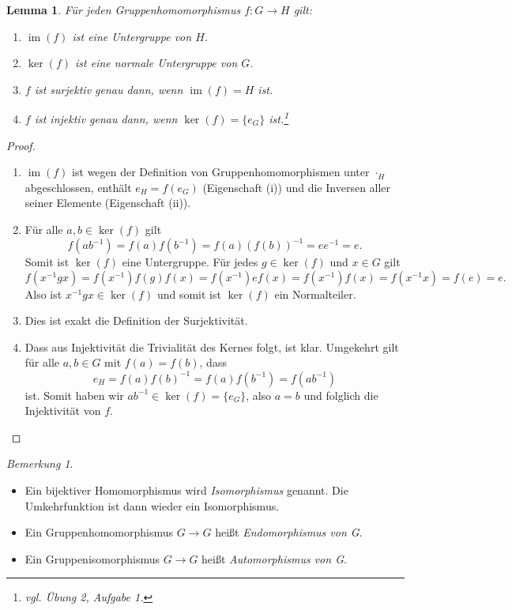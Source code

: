 \documentclass[12pt]{scrartcl} %
\DeclareMathOperator{\im}{im}
\newtheorem{lemma}{Lemma}
\theoremstyle{definition}
\theoremstyle{remark}
\newtheorem*{nb}{Bemerkung}
\begin{document}
\begin{lemma}
	Für jeden Gruppenhomomorphismus $ f: G \rightarrow H$ gilt:
	\begin{enumerate}[label=(\roman*)]
	\item $\im(f)$ ist eine Untergruppe von $H$.
	\item $\ker(f)$ ist eine normale Untergruppe von $G$.
	\item $f$ ist surjektiv genau dann, wenn $\im(f) = H$ ist.
	\item $f$ ist injektiv genau dann, wenn $\ker(f) = \{e_G\}$ ist.\footnote{vgl. Übung 2, Aufgabe 1.}
	\end{enumerate}
\end{lemma}

\begin{proof}
	\begin{enumerate}[label=(\roman*)]
	\item $\im(f)$ ist wegen der Definition von Gruppenhomomorphismen unter $\cdot_H$ abgeschlossen, enthält $e_H = f(e_G)$ (Eigenschaft (i)) und die Inversen aller seiner Elemente (Eigenschaft (ii)).
	\item Für alle $a, b \in \ker(f)$ gilt
		$$ f(ab^{-1}) = f(a)f(b^{-1}) = f(a)(f(b))^{-1} = ee^{-1} = e.$$
		Somit ist $\ker(f)$ eine Untergruppe.
		Für jedes $ g \in \ker(f)$ und $x \in G$ gilt
		$$ f(x^{-1}gx) = f(x^{-1})f(g)f(x) = f(x^{-1}) e f(x) = f(x^{-1})f(x) = f(x^{-1}x) = f(e) = e.$$
		Also ist $x^{-1}gx \in \ker(f) $ und somit ist $\ker(f)$ ein Normalteiler.
	\item Dies ist exakt die Definition der Surjektivität.
	\item Dass aus Injektivität die Trivialität des Kernes folgt, ist klar.
		Umgekehrt gilt für alle \(a, b \in G\) mit \(f(a) = f(b)\), dass \[e_H = f(a)f(b)^{-1} =f(a)f(b^{-1}) = f(ab^{-1})\] ist.
		Somit haben wir \(ab^{-1} \in \ker(f) = \{e_G\}\), also \(a = b\) und folglich die Injektivität von \(f\). \qedhere
	\end{enumerate}	
\end{proof}

\begin{nb}
	\begin{itemize}
	\item Ein bijektiver Homomorphismus wird \emph{Isomorphismus} genannt. Die Umkehrfunktion ist dann wieder ein Isomorphismus.
	\item Ein Gruppenhomomorphismus $G \rightarrow G$ heißt \emph{Endomorphismus von G}.
	\item Ein Gruppenisomorphismus $G \rightarrow G$ heißt \emph{Automorphismus von G}.
	\end{itemize}
\end{nb}
\end{document}
